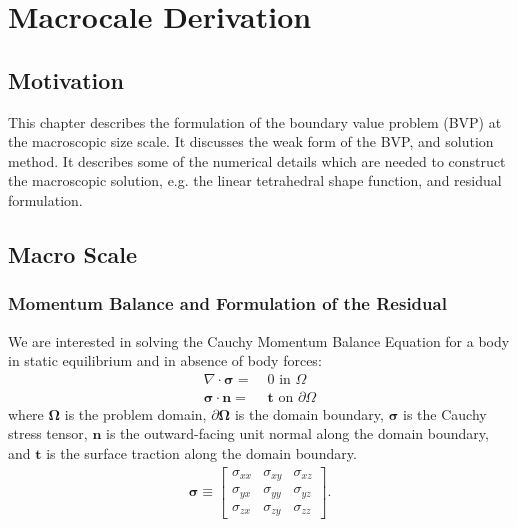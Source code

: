 \chapter{Macrocale Derivation}

\section{Motivation}

This chapter describes the formulation of the boundary value problem (BVP) at the macroscopic size scale. It discusses the weak form of the BVP, and solution method. It describes some of the numerical details which are needed to construct the macroscopic solution, e.g. the linear tetrahedral shape function, and residual formulation.

\section{Macro Scale}

\subsection{Momentum Balance and Formulation of the Residual}

We are interested in solving the Cauchy Momentum Balance Equation for a body in static equilibrium and in absence of body forces:
%
\begin{align}
\nabla \cdot \pmb{\sigma} =& \; 0 \text{ in } \Omega \label{momentum_balance} \\
\pmb{\sigma} \cdot \pmb{n} =& \; \pmb{t} \text{ on } \partial \Omega \nonumber
\end{align}
%
where $\pmb{\Omega}$ is the problem domain, $\partial \pmb{\Omega}$ is the domain boundary, $\pmb{\sigma}$ is the Cauchy stress tensor, $\pmb{n}$ is the outward-facing unit normal along the domain boundary, and $\pmb{t}$ is the surface traction along the domain boundary.
%
\begin{eqnarray}
\pmb{\sigma} \equiv
\begin{bmatrix}
\sigma_{xx} & \sigma_{xy} & \sigma_{xz} \\
\sigma_{yx} & \sigma_{yy} & \sigma_{yz} \\
\sigma_{zx} & \sigma_{zy} & \sigma_{zz} 
\end{bmatrix} .
\label{cauchy_stress_tensor}
\end{eqnarray}
%

